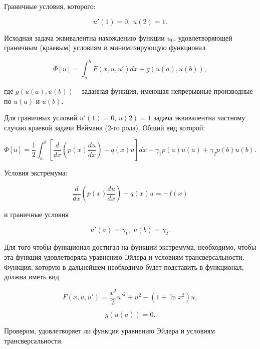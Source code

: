 \documentclass{article}
\begin{document}
\noindent Граничные условия, которого:

\begin{displaymath}
	u'(1) = 0, \; u(2) = 1.
\end{displaymath}

Исходная задача эквивалентна нахождению функции $u_{0}$, удовлетворяющей граничным (краевым) условиям и минимизирующую функционал

\begin{displaymath}
	\Phi[u] = \int_{a}^{b} F(x, u, u')dx + g(u(a), u(b)),
\end{displaymath}

\noindent где $g(u(a), u(b))$ – заданная функция, имеющая непрерывные производные по $u(a)$ и $u(b)$.

Для граничных условий $u'(1) = 0$, $u(2) = 1$ задача эквивалентна частному случаю краевой задачи Неймана (2-го рода). Общий вид которой:

\begin{displaymath}
	\Phi[u] = \frac{1}{2} \int_{a}^{b} \left[ \frac{d}{dx} \left( p(x) \frac{d u}{dx} \right) - q(x)u \right] dx - \gamma_{1} p(a) u(a) + \gamma_{2} p(b) u(b).
\end{displaymath}

\noindent Условия экстремума:

\begin{displaymath}
	\frac{d}{dx} \left( p(x) \frac{d u}{dx} \right) - q(x)u = -f(x)
\end{displaymath}

\noindent и граничные условия

\begin{displaymath}
	u'(a) = \gamma_{1}, \; u(b) = \gamma_{2}.
\end{displaymath}

Для того чтобы функционал достигал на функции экстремума, необходимо, чтобы эта функция удовлетворяла уравнению Эйлера и условиям трансверсальности. Функция, которую в дальнейшем необходимо будет подставить в функционал, должна иметь вид

\begin{equation}\label{equation_func_rank_2}
	F(x, u, u') = \frac{x^2}{2}u'^2 + u^2 - (1+\ln{x^2})u,
\end{equation}

\begin{displaymath}
	g(u(a)) = 0.
\end{displaymath}

\noindent Проверим, удовлетворяет ли функция уравнению Эйлера и условиям трансверсальности. 
\end{document}
